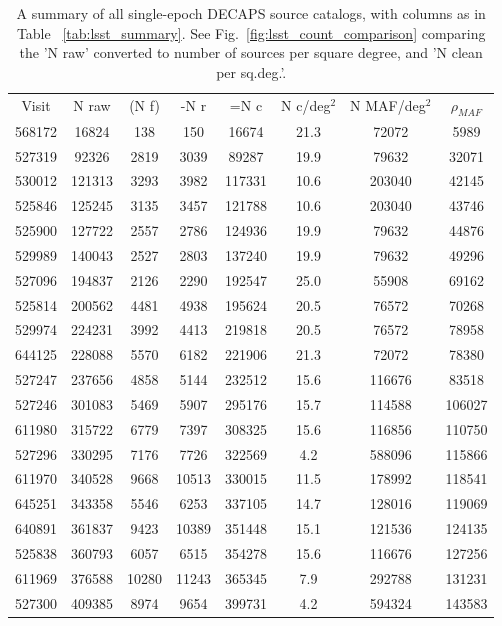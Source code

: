 \documentclass[DM,lsstdraft,toc,usenatbib]{lsstdoc}
\begin{document}
\begin{table}
\centering
\caption{A summary of all single-epoch DECAPS source catalogs, with columns as in  Table ~\ref{tab:lsst_summary}. See Fig.~\ref{fig:lsst_count_comparison} comparing the 'N raw' converted to number of sources per square degree, and  'N clean per sq.deg.'.  }
\label{tab:decaps_summary}
\begin{tabular}{cccccccc}
Visit & N raw & (N f) & -N r & =N c & N c/deg$^{2}$ & N MAF/deg$^{2}$ & $\rho_{MAF}$ \\
568172 & 16824 & 138 & 150 & 16674 & 21.3 & 72072 & 5989 \\
527319 & 92326 & 2819 & 3039 & 89287 & 19.9 & 79632 & 32071 \\
530012 & 121313 & 3293 & 3982 & 117331 & 10.6 & 203040 & 42145 \\
525846 & 125245 & 3135 & 3457 & 121788 & 10.6 & 203040 & 43746 \\
525900 & 127722 & 2557 & 2786 & 124936 & 19.9 & 79632 & 44876 \\
529989 & 140043 & 2527 & 2803 & 137240 & 19.9 & 79632 & 49296 \\
527096 & 194837 & 2126 & 2290 & 192547 & 25.0 & 55908 & 69162 \\
525814 & 200562 & 4481 & 4938 & 195624 & 20.5 & 76572 & 70268 \\
529974 & 224231 & 3992 & 4413 & 219818 & 20.5 & 76572 & 78958 \\
644125 & 228088 & 5570 & 6182 & 221906 & 21.3 & 72072 & 78380 \\
527247 & 237656 & 4858 & 5144 & 232512 & 15.6 & 116676 & 83518 \\
527246 & 301083 & 5469 & 5907 & 295176 & 15.7 & 114588 & 106027 \\
611980 & 315722 & 6779 & 7397 & 308325 & 15.6 & 116856 & 110750 \\
527296 & 330295 & 7176 & 7726 & 322569 & 4.2 & 588096 & 115866 \\
611970 & 340528 & 9668 & 10513 & 330015 & 11.5 & 178992 & 118541 \\
645251 & 343358 & 5546 & 6253 & 337105 & 14.7 & 128016 & 119069 \\
640891 & 361837 & 9423 & 10389 & 351448 & 15.1 & 121536 & 124135 \\
525838 & 360793 & 6057 & 6515 & 354278 & 15.6 & 116676 & 127256 \\
611969 & 376588 & 10280 & 11243 & 365345 & 7.9 & 292788 & 131231 \\
527300 & 409385 & 8974 & 9654 & 399731 & 4.2 & 594324 & 143583 \\

\end{tabular}
\end{table}
\end{document}
